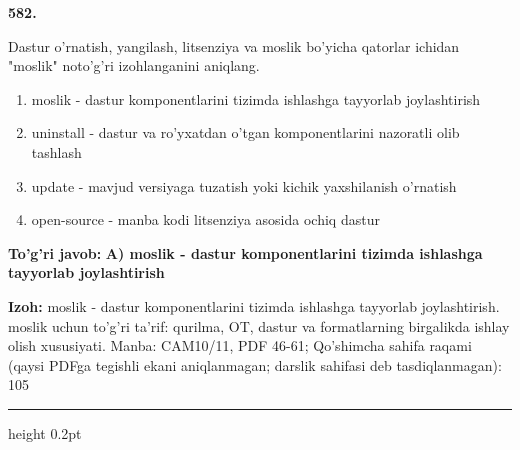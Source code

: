 \documentclass[10pt,a4paper]{article}
\begin{document}
{\bfseries\sffamily\color{ink} 582.}
\par
Dastur o'rnatish, yangilash, litsenziya va moslik bo'yicha qatorlar ichidan "moslik" noto'g'ri izohlanganini aniqlang.
\begin{enumerate}[label=\Alph*),leftmargin=9mm]
\item moslik - dastur komponentlarini tizimda ishlashga tayyorlab joylashtirish
\item uninstall - dastur va ro'yxatdan o'tgan komponentlarini nazoratli olib tashlash
\item update - mavjud versiyaga tuzatish yoki kichik yaxshilanish o'rnatish
\item open-source - manba kodi litsenziya asosida ochiq dastur
\end{enumerate}
\begin{tcolorbox}[enhanced,breakable,colback=teal!4,colframe=teal!60!black,boxrule=0.45pt,arc=1.2mm,left=2.7mm,right=2.7mm,top=1.8mm,bottom=1.8mm,before skip=2mm,after skip=2mm]
{\bfseries\sffamily\color{teal}To'g'ri javob:} \textbf{A) moslik - dastur komponentlarini tizimda ishlashga tayyorlab joylashtirish}
\par\smallskip
{\bfseries Izoh:} moslik - dastur komponentlarini tizimda ishlashga tayyorlab joylashtirish. moslik uchun to'g'ri ta'rif: qurilma, OT, dastur va formatlarning birgalikda ishlay olish xususiyati. Manba: CAM10/11, PDF 46-61; Qo'shimcha sahifa raqami (qaysi PDFga tegishli ekani aniqlanmagan; darslik sahifasi deb tasdiqlanmagan): 105
\end{tcolorbox}
\vspace{2mm}\hrule height 0.2pt\vspace{3mm}
\end{document}
